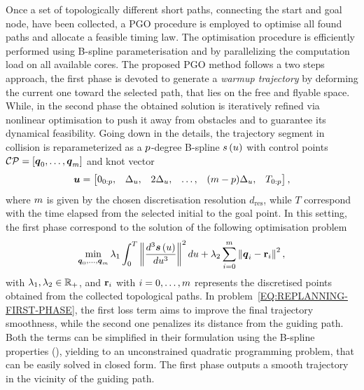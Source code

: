 Once a set of topologically different short paths, connecting the start and goal node, have been collected, a PGO procedure is employed to
optimise all found paths and allocate a feasible timing law. The optimisation procedure is efficiently performed using B-spline parameterisation and
by parallelizing the computation load on all available cores.
The proposed PGO method follows a two steps approach, the first phase is devoted to generate a \emph{warmup trajectory} by deforming the
current one toward the selected path, that lies on the free and flyable space. While, in the second phase the obtained solution is
iteratively refined via nonlinear optimisation to push it away from obstacles and to guarantee its dynamical feasibility.
Going down in the details, the trajectory segment in collision is reparameterized as a $p$-degree B-spline $s \left( u \right)$
with control points $\mathcal{CP} = \left[ \boldsymbol{q}_0, \dots, \boldsymbol{q}_{m} \right]$ and knot vector
\begin{equation*}
	\boldsymbol{u} =
	\begin{bmatrix}
		0_{0:p}, & \Delta_{u}, & 2\Delta_{u}, & \dots, & (m-p)\Delta_{u}, & T_{0:p}
	\end{bmatrix},
\end{equation*}
where $m$ is given by the chosen discretisation resolution $d_{\text{res}}$, while $T$ correspond with the time elapsed from
the selected initial to the goal point. In this setting, the first phase correspond to the solution of the following optimisation problem
\begin{equation}%
    \label{EQ:REPLANNING-FIRST-PHASE}
	\min_{\bs{\cpoint}_{0}, \dots, \bs{\cpoint}_{\cpnumber}}
				\lambda_1 \int_0^{T} \norm{\frac{d^3 \bs{\spline} \lp \splinevar \rp}{d \splinevar^3}}^2 d \splinevar
				+ \lambda_2 \sum_{i=0}^{\cpnumber} \norm{\bs{\cpoint}_i - \rr_i}^2,
\end{equation}
with $\lambda_1, \lambda_2 \in \mathbb{R}_+$, and $\mathbf{r}_i$ with $i = 0, \dots, m$ represents the discretised points obtained from the 
collected topological paths. In problem~\eqref{EQ:REPLANNING-FIRST-PHASE}, the first loss term aims to improve the final trajectory
smoothness, while the second one penalizes its distance from the guiding path. Both the terms can be simplified in their formulation using
the B-spline properties (), yielding to an unconstrained quadratic programming problem, that can be
easily solved in closed form. The first phase outputs a smooth trajectory in the vicinity of the guiding path.

